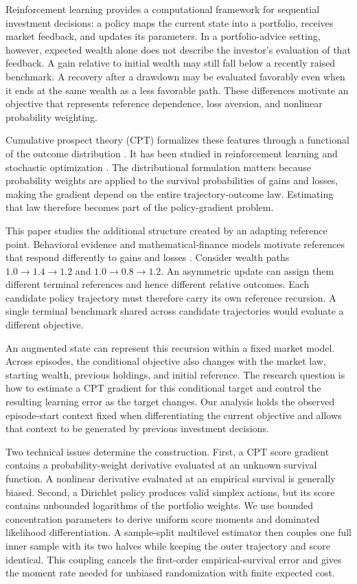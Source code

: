 \documentclass[11pt]{article}
\newcommand{\1}{\mathbf 1}
\newcommand{\CPT}{\ensuremath{\mathrm{CPT}}\xspace}
\begin{document}
Reinforcement learning provides a computational framework for sequential investment decisions: a policy maps the current state into a portfolio, receives market feedback, and updates its parameters. In a portfolio-advice setting, however, expected wealth alone does not describe the investor's evaluation of that feedback. A gain relative to initial wealth may still fall below a recently raised benchmark. A recovery after a drawdown may be evaluated favorably even when it ends at the same wealth as a less favorable path. These differences motivate an objective that represents reference dependence, loss aversion, and nonlinear probability weighting.

Cumulative prospect theory (\CPT) formalizes these features through a functional of the outcome distribution \citep{kahneman1979prospect,tversky1992advances}. It has been studied in reinforcement learning and stochastic optimization \citep{prashanth2016cumulative,jie2018stochastic,lepel2024policygradients}. The distributional formulation matters because probability weights are applied to the survival probabilities of gains and losses, making the gradient depend on the entire trajectory-outcome law. Estimating that law therefore becomes part of the policy-gradient problem.

This paper studies the additional structure created by an adapting reference point. Behavioral evidence and mathematical-finance models motivate references that respond differently to gains and losses \citep{arkes2008reference,arkes2010cross,he2019realization,qin2022realization}. Consider wealth paths $1.0\to1.4\to1.2$ and $1.0\to0.8\to1.2$. An asymmetric update can assign them different terminal references and hence different relative outcomes. Each candidate policy trajectory must therefore carry its own reference recursion. A single terminal benchmark shared across candidate trajectories would evaluate a different objective.

An augmented state can represent this recursion within a fixed market model. Across episodes, the conditional objective also changes with the market law, starting wealth, previous holdings, and initial reference. The research question is how to estimate a \CPT gradient for this conditional target and control the resulting learning error as the target changes. Our analysis holds the observed episode-start context fixed when differentiating the current objective and allows that context to be generated by previous investment decisions.

Two technical issues determine the construction. First, a \CPT score gradient contains a probability-weight derivative evaluated at an unknown survival function. A nonlinear derivative evaluated at an empirical survival is generally biased. Second, a Dirichlet policy produces valid simplex actions, but its score contains unbounded logarithms of the portfolio weights. We use bounded concentration parameters to derive uniform score moments and dominated likelihood differentiation. A sample-split multilevel estimator then couples one full inner sample with its two halves while keeping the outer trajectory and score identical. This coupling cancels the first-order empirical-survival error and gives the moment rate needed for unbiased randomization with finite expected cost.
\end{document}
